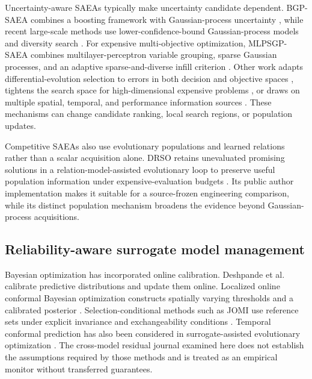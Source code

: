 \documentclass[cmc,article,submit,moreauthors,pdftex]{Definitions/tsp}
\begin{document}
Uncertainty-aware SAEAs typically make uncertainty candidate dependent. BGP-SAEA combines a boosting framework with Gaussian-process uncertainty \cite{ref-6}, while recent large-scale methods use lower-confidence-bound Gaussian-process models and diversity search \cite{ref-7}. For expensive multi-objective optimization, MLPSGP-SAEA combines multilayer-perceptron variable grouping, sparse Gaussian processes, and an adaptive sparse-and-diverse infill criterion \cite{ref-32}. Other work adapts differential-evolution selection to errors in both decision and objective spaces \cite{ref-8}, tightens the search space for high-dimensional expensive problems \cite{ref-9}, or draws on multiple spatial, temporal, and performance information sources \cite{ref-10}. These mechanisms can change candidate ranking, local search regions, or population updates.

Competitive SAEAs also use evolutionary populations and learned relations rather than a scalar acquisition alone. DRSO retains unevaluated promising solutions in a relation-model-assisted evolutionary loop to preserve useful population information under expensive-evaluation budgets \cite{ref-30}. Its public author implementation makes it suitable for a source-frozen engineering comparison, while its distinct population mechanism broadens the evidence beyond Gaussian-process acquisitions.

\hypertarget{reliability-aware-surrogate-model-management}{%
\subsection{Reliability-aware surrogate model management}\label{reliability-aware-surrogate-model-management}}

Bayesian optimization has incorporated online calibration. Deshpande et al.~\cite{ref-12} calibrate predictive distributions and update them online. Localized online conformal Bayesian optimization constructs spatially varying thresholds and a calibrated posterior \cite{ref-13}. Selection-conditional methods such as JOMI use reference sets under explicit invariance and exchangeability conditions \cite{ref-14}. Temporal conformal prediction has also been considered in surrogate-assisted evolutionary optimization \cite{ref-15}. The cross-model residual journal examined here does not establish the assumptions required by those methods and is treated as an empirical monitor without transferred guarantees.
\end{document}
